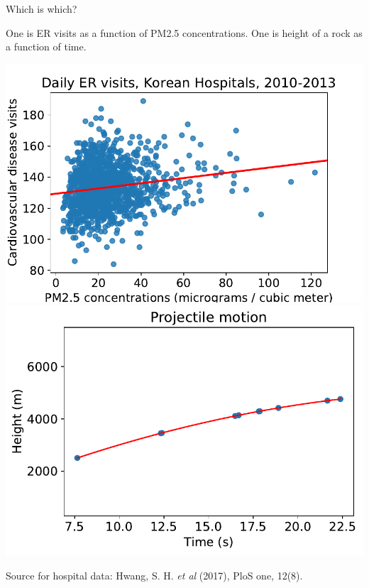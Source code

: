 \documentclass[aspectratio=169]{beamer}
\begin{document}
\begin{frame}{Which is which?}


One is ER visits as a function of PM2.5 concentrations.  One is height of a rock as a function of time.

\includegraphics[scale=0.475]{data/Huang_et_al/huang_pm25vcirc_regplot.pdf}\includegraphics[scale=0.475]{data/Huang_et_al/projectile.pdf}

\begin{tiny}
Source for hospital data: Hwang, S. H. \textit{et al} (2017), PloS one, 12(8).
\end{tiny}

\end{frame}
\end{document}
